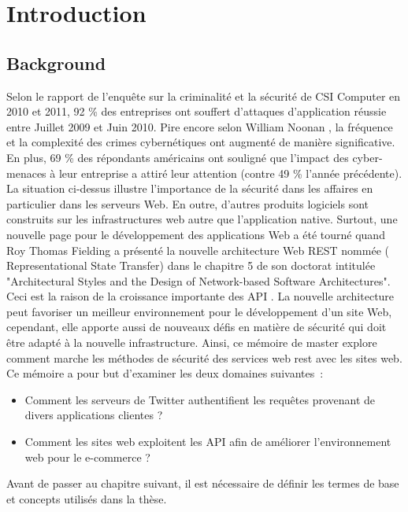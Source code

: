 \chapter{Introduction}
\label{chp: chap1}

\section{Background}
Selon le rapport de l'enquête sur la criminalité et la sécurité de CSI Computer en 2010 et 2011, 92 \% des entreprises ont souffert d'attaques d'application réussie entre Juillet 2009 et Juin 2010. Pire encore selon William Noonan \cite{14}, la fréquence et la complexité des crimes cybernétiques ont augmenté de manière significative. En plus, 69 \% des répondants américains ont souligné que l'impact des cyber-menaces à leur entreprise a attiré leur attention (contre 49 \% l'année précédente). La situation ci-dessus illustre l'importance de la sécurité dans les affaires en particulier dans les serveurs Web. En outre, d'autres produits logiciels sont construits sur les infrastructures web autre que l'application native. Surtout, une nouvelle page pour le développement des applications Web a été tourné quand Roy Thomas Fielding a présenté la nouvelle architecture  Web REST nommée ( Representational State Transfer) dans le chapitre 5 de son doctorat  intitulée "Architectural Styles and the Design of Network-based Software Architectures". Ceci est la raison de la croissance importante des API \cite{1}. La nouvelle architecture peut favoriser un meilleur environnement pour le développement d’un site Web, cependant, elle apporte aussi de nouveaux défis en matière de sécurité qui doit être adapté à la nouvelle infrastructure. Ainsi, ce mémoire de master explore comment marche les méthodes de sécurité des services web rest avec les sites web.
Ce mémoire a pour but d'examiner les deux domaines suivantes :
\begin{itemize}
\item Comment les serveurs de Twitter authentifient les requêtes provenant de divers applications clientes ?
\item Comment les sites web exploitent les API afin de améliorer l'environnement web pour le e-commerce ?
\end{itemize}

Avant de passer au chapitre suivant, il est nécessaire de définir les termes de base et
concepts utilisés dans la thèse.

